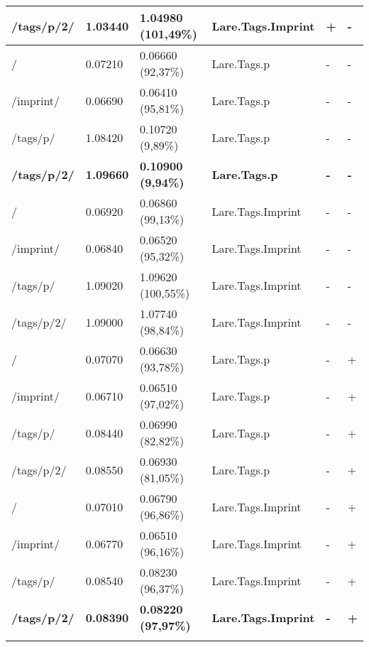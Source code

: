 \begin{appendix}
\begin{center}
\begin{longtable}{llllll}
    \textbf{/tags/p/2/} & \textbf{1.03440} & \textbf{1.04980 (101,49\%)} & \textbf{Lare.Tags.Imprint} & \textbf{+} & \textbf{-}\\
    \hline
	\hline
	/ & 0.07210 & 0.06660 (92,37\%) & Lare.Tags.p & - & - \\
	/imprint/ & 0.06690 & 0.06410 (95,81\%) & Lare.Tags.p & - & - \\
	/tags/p/ & 1.08420 & 0.10720 (9,89\%) & Lare.Tags.p & - & - \\
    \textbf{/tags/p/2/} & \textbf{1.09660} & \textbf{0.10900 (9,94\%)} & \textbf{Lare.Tags.p} & \textbf{-} & \textbf{-}\\
    \hline
	/ & 0.06920 & 0.06860 (99,13\%) & Lare.Tags.Imprint & - & - \\
	/imprint/ & 0.06840 & 0.06520 (95,32\%) & Lare.Tags.Imprint & - & - \\
	/tags/p/ & 1.09020 & 1.09620 (100,55\%) & Lare.Tags.Imprint & - & - \\
	/tags/p/2/ & 1.09000 & 1.07740 (98,84\%) & Lare.Tags.Imprint & - & - \\
	\hline
	\hline
	/ & 0.07070 & 0.06630 (93,78\%) & Lare.Tags.p & - & + \\
	/imprint/ & 0.06710 & 0.06510 (97,02\%) & Lare.Tags.p & - & + \\
	/tags/p/ & 0.08440 & 0.06990 (82,82\%) & Lare.Tags.p & - & + \\
	/tags/p/2/ & 0.08550 & 0.06930 (81,05\%) & Lare.Tags.p & - & + \\
	\hline
	/ & 0.07010 & 0.06790 (96,86\%) & Lare.Tags.Imprint & - & + \\
	/imprint/ & 0.06770 & 0.06510 (96,16\%) & Lare.Tags.Imprint & - & + \\
	/tags/p/ & 0.08540 & 0.08230 (96,37\%) & Lare.Tags.Imprint & - & + \\
	\textbf{/tags/p/2/} & \textbf{0.08390} & \textbf{0.08220 (97,97\%)} & \textbf{Lare.Tags.Imprint} & \textbf{-} & \textbf{+} \\
	\hline
\label{tab:curl_results_local}
\end{longtable}
\end{center}

\newpage{}


\end{appendix}
